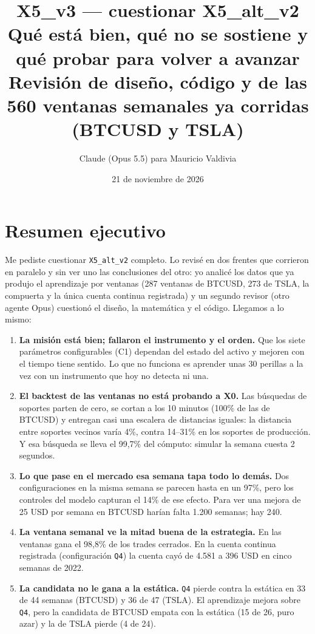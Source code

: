\documentclass[11pt,a4paper]{article}
\title{\vspace{-1.6cm}\textbf{X5\_v3 — cuestionar X5\_alt\_v2}\\[6pt]
  \large Qué está bien, qué no se sostiene y qué probar para volver a avanzar\\[4pt]
  \normalsize\color{cgris} Revisión de diseño, código y de las 560 ventanas semanales ya corridas (BTCUSD y TSLA)}
\author{Claude (Opus 5.5) para Mauricio Valdivia}
\date{21 de noviembre de 2026}
\newcommand{\code}[1]{\texttt{\small #1}}
\begin{document}
\maketitle
\vspace{-0.6cm}

\section*{Resumen ejecutivo}

Me pediste cuestionar \code{X5\_alt\_v2} completo. Lo revisé en dos frentes que corrieron en paralelo y
sin ver uno las conclusiones del otro: yo analicé los datos que ya produjo el aprendizaje por ventanas
(287 ventanas de BTCUSD, 273 de TSLA, la compuerta y la única cuenta continua registrada) y un segundo
revisor (otro agente Opus) cuestionó el diseño, la matemática y el código. Llegamos a lo mismo:

\begin{enumerate}[leftmargin=1.4em]
  \item \textbf{La misión está bien; fallaron el instrumento y el orden.} Que los siete parámetros
        configurables (C1) dependan del estado del activo y mejoren con el tiempo tiene sentido. Lo que no
        funciona es aprender unas 30 perillas a la vez con un instrumento que hoy no detecta ni una.
  \item \textbf{El backtest de las ventanas no está probando a X0.} Las búsquedas de soportes parten de cero,
        se cortan a los 10 minutos (100\% de las de BTCUSD) y entregan casi una escalera de distancias
        iguales: la distancia entre soportes vecinos varía 4\%, contra 14--31\% en los soportes de
        producción. Y esa búsqueda se lleva el 99,7\% del cómputo: simular la semana cuesta 2 segundos.
  \item \textbf{Lo que pase en el mercado esa semana tapa todo lo demás.} Dos configuraciones en la misma
        semana se parecen hasta en un 97\%, pero los controles del modelo capturan el 14\% de ese efecto.
        Para ver una mejora de 25 USD por semana en BTCUSD harían falta 1.200 semanas; hay 240.
  \item \textbf{La ventana semanal ve la mitad buena de la estrategia.} En las ventanas gana el 98,8\% de
        los trades cerrados. En la cuenta continua registrada (configuración \code{Q4}) la cuenta cayó de
        4.581 a 396 USD en cinco semanas de 2022.
  \item \textbf{La candidata no le gana a la estática.} \code{Q4} pierde contra la estática en 33 de 44
        semanas (BTCUSD) y 36 de 47 (TSLA). El aprendizaje mejora sobre \code{Q4}, pero la candidata de
        BTCUSD empata con la estática (15 de 26, puro azar) y la de TSLA pierde (4 de 24).
\end{enumerate}
\end{document}
